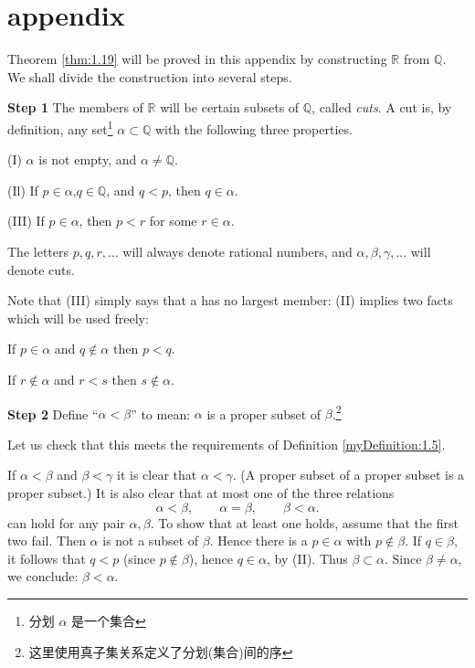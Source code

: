 \section*{appendix}
Theorem \ref{thm:1.19} will be proved in this appendix by constructing $\mathbb{R}$ from $\mathbb{Q}$. We
shall divide the construction into several steps.

\textbf{Step 1} 
The members of $\mathbb{R}$ will be certain subsets of $\mathbb{Q}$, called \emph{cuts}. A cut is,
by definition, any set\footnote{分划 $\alpha$ 是一个集合} $\alpha \subset \mathbb{Q}$ with the following three properties.

(I) $\alpha$ is not empty, and $\alpha \neq \mathbb{Q}$.

(Il) If $p\in \alpha$,$q \in \mathbb{Q}$, and $q <p$, then $q \in \alpha$.

(III) If $p \in \alpha$, then $p <r$ for some $r\in \alpha$.

The letters $p, q, r, ...$ will always denote rational numbers, and $\alpha, \beta, \gamma, ...$
will denote cuts.


Note that (III) simply says that a has no largest member: (II) implies two facts which will be used freely:

If $p\in\alpha$ and $q\not\in\alpha$ then $p<q$.

If $r\not\in \alpha$ and $r<s$ then $s\not\in \alpha$.

\textbf{Step 2}
Define ``$\alpha < \beta$'' to mean: $\alpha$ is a proper subset of $\beta$.\footnote{这里使用真子集关系定义了分划(集合)间的序}

Let us check that this meets the requirements of Definition \ref{myDefinition:1.5}.

If $\alpha < \beta$ and $\beta < \gamma$ it is clear that $\alpha < \gamma$. (A proper subset of a proper subset is a proper subset.) It is also clear that at most one of the three relations
\begin{equation*}
    \alpha < \beta, \qquad
    \alpha = \beta, \qquad
    \beta < \alpha.
\end{equation*}
can hold for any pair $\alpha, \beta$. To show that at least one holds, assume that the first two fail. Then $\alpha$ is not a subset of $\beta$. Hence there is a $p \in \alpha$ with $p \not\in \beta$. If $q \in \beta$, it follows that $q <p$ (since $p \not\in \beta$), hence $q \in \alpha$, by (II). Thus $\beta \subset \alpha$. Since $\beta \neq \alpha$, we conclude: $\beta < \alpha$.

